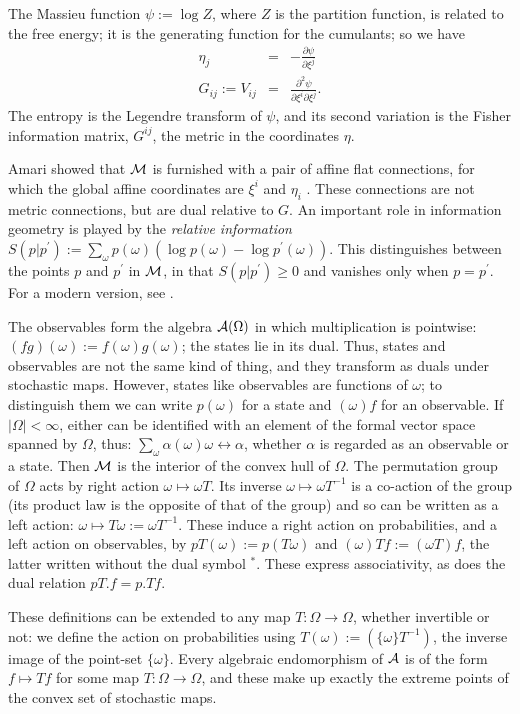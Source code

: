 The Massieu function $\psi:=\log Z$, where $Z$ is the partition function,
is related to the free energy; it is the generating function for
the cumulants; so we have
\begin{eqnarray}
\eta_j&=&-\frac{\partial \psi}{\partial \xi^j}\\
G_{ij}:=V_{ij}&=&\frac{\partial^2\psi}{\partial\xi^i\partial\xi^j}.
\end{eqnarray}
The entropy is the Legendre transform of $\psi$, and its second variation
is the Fisher information matrix, $G^{ij}$, the metric in the coordinates
$\eta$.

Amari showed that ${\cal M}$ is furnished with a pair of affine flat
connections, for which the global affine coordinates are $\xi^i$
and $\eta_i$ \cite{Amari}. These connections are not metric connections, but
are dual
relative to $G$. An important role in information geometry is played
by the {\em relative information} $S(p|p^\prime):=\sum_\omega p(\omega)
(\log p(\omega)-\log p^\prime(\omega))$. This distinguishes between the
points $p$ and $p^\prime$ in ${\cal M}$, in that $S(p|p^\prime)\geq 0$ and
vanishes only when $p=p^\prime$. For a modern version, see \cite{Pistone}.

The observables form the algebra ${\cal A}(\Omega)$ in which multiplication
is pointwise: $(fg)(\omega):=f(\omega)g(\omega)$; the states lie in
its dual. Thus, states and observables are not the same kind of thing,
and they transform as duals under stochastic maps.
However, states like observables are functions  of $\omega$; to distinguish
them we can write $p(\omega)$ for a state and
$(\omega)f$ for an
observable.  If $|\Omega|<\infty$, either can be identified with an element
of the formal vector space spanned by $\Omega$, thus: $\sum_\omega
\alpha(\omega)\omega\leftrightarrow\alpha$, whether $\alpha$ is regarded
as an observable or
a state. Then ${\cal M}$ is the interior of the convex hull of $\Omega$.
The permutation group of $\Omega$ acts by right action
$\omega\mapsto\omega T$. Its inverse $\omega\mapsto\omega T^{-1}$
is a co-action of the group (its product law is the opposite of that
of the group) and so can be written as a left action: $\omega\mapsto
T\omega:=\omega T^{-1}$. These induce a right action on probabilities,
and a left action on observables, by $pT(\omega):=p(T\omega)$ and
$(\omega)Tf:=(\omega T)f$, the latter written without the dual symbol $^*$.
These express associativity, as does the dual relation $pT.f=p.Tf$.

These definitions can be extended to any map $T:\Omega\rightarrow\Omega$,
whether invertible or not: we define the action on probabilities
using $T(\omega):=(\{\omega\}T^{-1})$, the inverse image of the point-set
$\{\omega\}$. Every algebraic
endomorphism of ${\cal A}$ is of the form $f\mapsto Tf$ for some map
$T:\Omega\rightarrow\Omega$, and these make up exactly
the extreme points of the convex set of stochastic maps.

